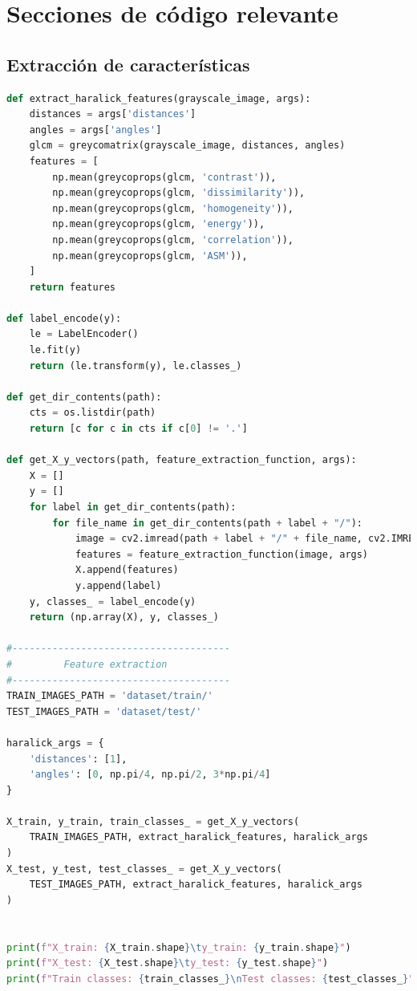 \documentclass[conference]{IEEEtran}
\begin{document}
\section{Secciones de código relevante}
\subsection{Extracción de características}
\begin{lstlisting}[language=python]
def extract_haralick_features(grayscale_image, args):
    distances = args['distances']
    angles = args['angles']
    glcm = greycomatrix(grayscale_image, distances, angles)
    features = [
        np.mean(greycoprops(glcm, 'contrast')),
        np.mean(greycoprops(glcm, 'dissimilarity')),
        np.mean(greycoprops(glcm, 'homogeneity')),
        np.mean(greycoprops(glcm, 'energy')),
        np.mean(greycoprops(glcm, 'correlation')),
        np.mean(greycoprops(glcm, 'ASM')),
    ]
    return features

def label_encode(y):
    le = LabelEncoder()
    le.fit(y)
    return (le.transform(y), le.classes_)

def get_dir_contents(path):
    cts = os.listdir(path)
    return [c for c in cts if c[0] != '.']

def get_X_y_vectors(path, feature_extraction_function, args):
    X = []
    y = []
    for label in get_dir_contents(path):
        for file_name in get_dir_contents(path + label + "/"):
            image = cv2.imread(path + label + "/" + file_name, cv2.IMREAD_GRAYSCALE)
            features = feature_extraction_function(image, args)
            X.append(features)
            y.append(label)
    y, classes_ = label_encode(y)
    return (np.array(X), y, classes_)

#--------------------------------------
#         Feature extraction
#--------------------------------------
TRAIN_IMAGES_PATH = 'dataset/train/'
TEST_IMAGES_PATH = 'dataset/test/'

haralick_args = {
    'distances': [1], 
    'angles': [0, np.pi/4, np.pi/2, 3*np.pi/4]
}

X_train, y_train, train_classes_ = get_X_y_vectors(
    TRAIN_IMAGES_PATH, extract_haralick_features, haralick_args
)
X_test, y_test, test_classes_ = get_X_y_vectors(
    TEST_IMAGES_PATH, extract_haralick_features, haralick_args
)


print(f"X_train: {X_train.shape}\ty_train: {y_train.shape}")
print(f"X_test: {X_test.shape}\ty_test: {y_test.shape}")
print(f"Train classes: {train_classes_}\nTest classes: {test_classes_}")\end{lstlisting}
\end{document}
